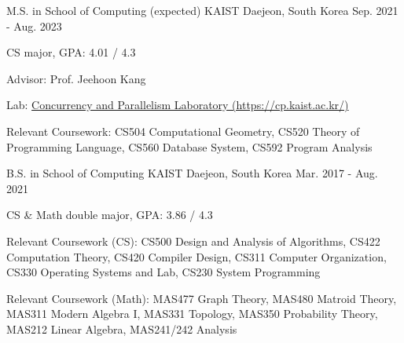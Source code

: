 

\begin{cventries}

  \cventry
    {M.S. in School of Computing (expected)} %
    {KAIST} %
    {Daejeon, South Korea} %
    {Sep. 2021 - Aug. 2023} %
    {
      \begin{cvitems} %
        \item {CS major, GPA: 4.01 / 4.3}
        \item {Advisor: Prof. Jeehoon Kang}
        \item {Lab: \href{https://cp.kaist.ac.kr/}{Concurrency and Parallelism Laboratory (https://cp.kaist.ac.kr/)} }
        \item {Relevant Coursework: CS504 Computational Geometry, CS520 Theory of Programming Language, CS560 Database System, CS592 Program Analysis}
      \end{cvitems}
    }

  \cventry
    {B.S. in School of Computing} %
    {KAIST} %
    {Daejeon, South Korea} %
    {Mar. 2017 - Aug. 2021} %
    {
      \begin{cvitems} %
        \item {CS \& Math double major, GPA: 3.86 / 4.3}
        \item {Relevant Coursework (CS): CS500 Design and Analysis of Algorithms, CS422 Computation Theory, CS420 Compiler Design, CS311 Computer Organization, CS330 Operating Systems and Lab, CS230 System Programming}
        \item {Relevant Coursework (Math): MAS477 Graph Theory, MAS480 Matroid Theory, MAS311 Modern Algebra I, MAS331 Topology, MAS350 Probability Theory, MAS212 Linear Algebra, MAS241/242 Analysis}
      \end{cvitems}
    }
\end{cventries}
